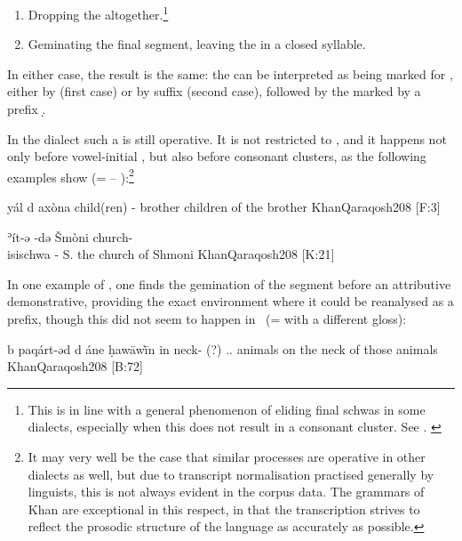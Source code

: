 \begin{enumerate}
\item Dropping the  altogether.\footnote{This is in line with a general phenomenon  of eliding final schwas in some  dialects, especially when this does not result in a consonant cluster. See \textcites[49f.]{KhanQaraqosh}[88f.]{CoghillAlqosh}. \label{ft:schwa_drop}}



\item Geminating the final  segment, leaving the  in a closed syllable.

\end{enumerate}

In either case, the result is the same: the \prim can be interpreted as being marked for \cst*, either by  (first case) or by \ed suffix (second case), followed by the \secn marked by a prefix \d. 


In the \Qar dialect such a  is still operative. It is not restricted to , and it happens not only before vowel-initial \secns, but also before consonant clusters, as the following examples show (=  -- ):\footnote{It may very well be the case that similar  processes are operative in other dialects as well, but due to transcript normalisation practised generally by linguists, this is not always evident in the corpus data. The grammars of Khan are exceptional in this respect, in that the transcription strives to reflect the prosodic structure of the language as accurately as possible.}

\lex{\Qar}{ }
{yál d\cb{} axòna}
{child(ren) -\cst\cb{} brother}
{children of the brother}
{KhanQaraqosh}{208 {[F:3]}}

{ʾít-ə -də\cb{} Šmòni}
{church-\\isi{schwa}{} -\cst\cb{} S.}
{the church of Shmoni}
{KhanQaraqosh}{208 {[K:21]}}

In one example of \Qar, one finds the gemination of the  segment before an attributive demonstrative, providing the exact environment where it could be reanalysed as a \gen* prefix, though this did not seem to happen in \Qar\ (= with a different gloss):

{b\cb{} paqárt-əd d\cb{} áne ḥawāwī̀n}
{in\cb{} neck-\cst{} \gen(?)\cb{} \dem.\far.\pl{} animals}
{on the neck of those animals}
{KhanQaraqosh}{208 {[B:72]}}


















